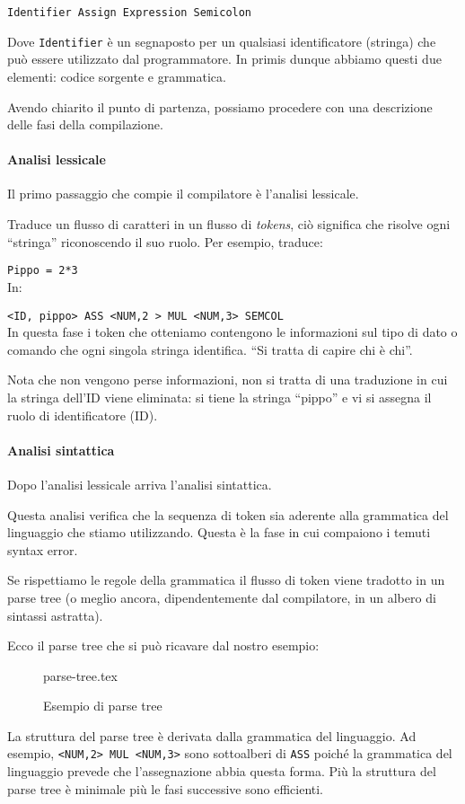 \documentclass[class=book, crop=false, oneside, 12pt]{standalone}
\begin{document}
\texttt{Identifier Assign Expression Semicolon}

Dove \texttt{Identifier} è un segnaposto per un qualsiasi identificatore (stringa) che può essere utilizzato dal programmatore.
In primis dunque abbiamo questi due elementi: codice sorgente e grammatica.

Avendo chiarito il punto di partenza, possiamo procedere con una descrizione delle fasi della compilazione.

\paragraph{Analisi lessicale}
Il primo passaggio che compie il compilatore è l’analisi lessicale.

Traduce un flusso di caratteri in un flusso di \emph{tokens}, ciò significa che risolve ogni “stringa” riconoscendo il suo ruolo. Per esempio, traduce:

\texttt{Pippo = 2*3}\\
In:

\texttt{<ID, pippo> ASS <NUM,2 > MUL <NUM,3> SEMCOL}\\
In questa fase i token che otteniamo contengono le informazioni sul tipo di dato o comando che ogni singola stringa identifica. “Si tratta di capire chi è chi”.

Nota che non vengono perse informazioni, non si tratta di una traduzione in cui la stringa dell’ID viene eliminata: si tiene la stringa “pippo” e vi si assegna il ruolo di identificatore (ID).

\paragraph{Analisi sintattica}
Dopo l’analisi lessicale arriva l’analisi sintattica.

Questa analisi verifica che la sequenza di token sia aderente alla grammatica del linguaggio che stiamo utilizzando. Questa è la fase in cui compaiono i temuti syntax error.

Se rispettiamo le regole della grammatica il flusso di token viene tradotto in un parse tree (o meglio ancora, dipendentemente dal compilatore, in un albero di sintassi astratta).

Ecco il parse tree che si può ricavare dal nostro esempio:
\begin{figure}[H]
	\centering
	{parse-tree.tex}
	\caption{Esempio di parse tree}
\end{figure}
La struttura del parse tree è derivata dalla grammatica del linguaggio. Ad esempio, \texttt{<NUM,2> MUL <NUM,3>} sono sottoalberi di \texttt{ASS} poiché la grammatica del linguaggio prevede che l’assegnazione abbia questa forma.
Più la struttura del parse tree è minimale più le fasi successive sono efficienti.
\end{document}
